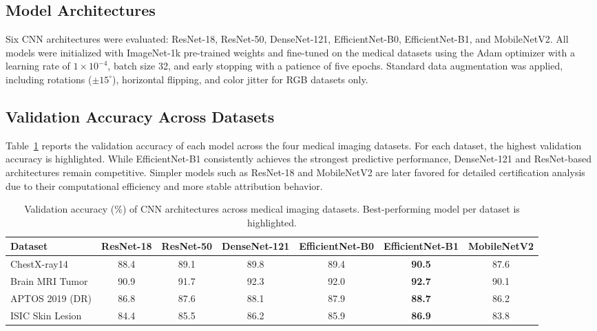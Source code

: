 \documentclass[11pt]{article}
\begin{document}
\subsection{Model Architectures}

Six CNN architectures were evaluated: ResNet-18, ResNet-50, DenseNet-121, EfficientNet-B0, EfficientNet-B1, and MobileNetV2. All models were initialized with ImageNet-1k pre-trained weights and fine-tuned on the medical datasets using the Adam optimizer with a learning rate of $1 \times 10^{-4}$, batch size 32, and early stopping with a patience of five epochs. Standard data augmentation was applied, including rotations ($\pm15^\circ$), horizontal flipping, and color jitter for RGB datasets only.

\subsection{Validation Accuracy Across Datasets}

Table~\ref{tab:val_acc_models} reports the validation accuracy of each model across the four medical imaging datasets. For each dataset, the highest validation accuracy is highlighted. While EfficientNet-B1 consistently achieves the strongest predictive performance, DenseNet-121 and ResNet-based architectures remain competitive. Simpler models such as ResNet-18 and MobileNetV2 are later favored for detailed certification analysis due to their computational efficiency and more stable attribution behavior.
\begin{table}[H]
\centering
\caption{Validation accuracy (\%) of CNN architectures across medical imaging datasets. Best-performing model per dataset is highlighted.}
\small
\setlength{\tabcolsep}{4pt} %
\renewcommand{\arraystretch}{1.15}
\begin{tabularx}{\linewidth}{|X|c|c|c|c|c|c|}
\hline
\textbf{Dataset} 
& \textbf{ResNet-18} 
& \textbf{ResNet-50} 
& \textbf{DenseNet-121} 
& \textbf{EfficientNet-B0} 
& \textbf{EfficientNet-B1} 
& \textbf{MobileNetV2} \\
\hline
ChestX-ray14 
& 88.4 & 89.1 & 89.8 & 89.4 & \cellcolor{gray!25}\textbf{90.5} & 87.6 \\
\hline
Brain MRI Tumor 
& 90.9 & 91.7 & 92.3 & 92.0 & \cellcolor{gray!25}\textbf{92.7} & 90.1 \\
\hline
APTOS 2019 (DR) 
& 86.8 & 87.6 & 88.1 & 87.9 & \cellcolor{gray!25}\textbf{88.7} & 86.2 \\
\hline
ISIC Skin Lesion 
& 84.4 & 85.5 & 86.2 & 85.9 & \cellcolor{gray!25}\textbf{86.9} & 83.8 \\
\hline
\end{tabularx}
\label{tab:val_acc_models}
\end{table}
\end{document}
